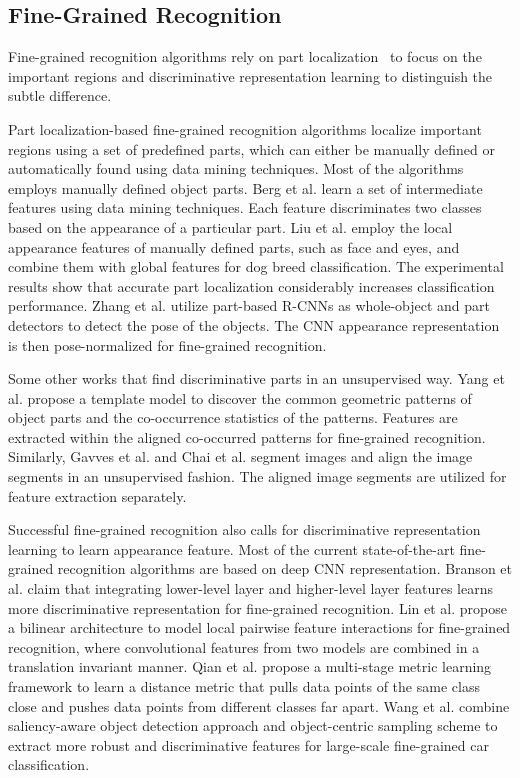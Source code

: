\documentclass[runningheads]{llncs}
\begin{document}
\subsection{Fine-Grained Recognition}
Fine-grained recognition algorithms rely on part localization~\cite{bd9,bd10,bd11,bd12,bd13,bd14} to focus on the important regions and discriminative representation learning to distinguish the subtle difference.

Part localization-based fine-grained recognition algorithms localize important regions using a set of predefined parts, which can either be manually defined or automatically found using data mining techniques.
Most of the algorithms employs manually defined object parts.
Berg et al. \cite{bd9} learn a set of intermediate features using data mining techniques.
Each feature discriminates two classes based on the appearance of a particular part.
Liu et al. \cite{bd10} employ the local appearance features of manually defined parts, such as face and eyes, and combine them with global features for dog breed classification.
The experimental results show that accurate part localization considerably increases classification performance.
Zhang et al. \cite{bd11} utilize part-based R-CNNs as whole-object and part detectors to detect the pose of the objects.  The CNN appearance representation is then pose-normalized for fine-grained recognition.

Some other works that find discriminative parts in an unsupervised way.
Yang et al. \cite{bd12} propose a template model to discover the common geometric patterns of object parts and the co-occurrence statistics of the patterns.
Features are extracted within the aligned co-occurred patterns for fine-grained recognition.
Similarly, Gavves et al. \cite{bd13} and Chai et al. \cite{bd14} segment images and align the image segments in an unsupervised fashion.
The aligned image segments are utilized for feature extraction separately.

Successful fine-grained recognition also calls for discriminative representation learning to learn appearance feature.
Most of the current state-of-the-art fine-grained recognition algorithms are based on deep CNN representation.
Branson et al. \cite{bd15} claim that integrating lower-level layer and higher-level layer features learns more discriminative representation for fine-grained recognition.
Lin et al. \cite{bd16} propose a bilinear architecture to model local pairwise feature interactions for fine-grained recognition, where convolutional features from two models are combined in a translation invariant manner.
Qian et al. \cite{bd17} propose a multi-stage metric learning framework to learn a distance metric that pulls data points of the same class close and pushes data points from different classes far apart.
Wang et al. \cite{bd18} combine saliency-aware object detection approach and object-centric sampling scheme to extract more robust and discriminative features for large-scale fine-grained car classification.
\end{document}
